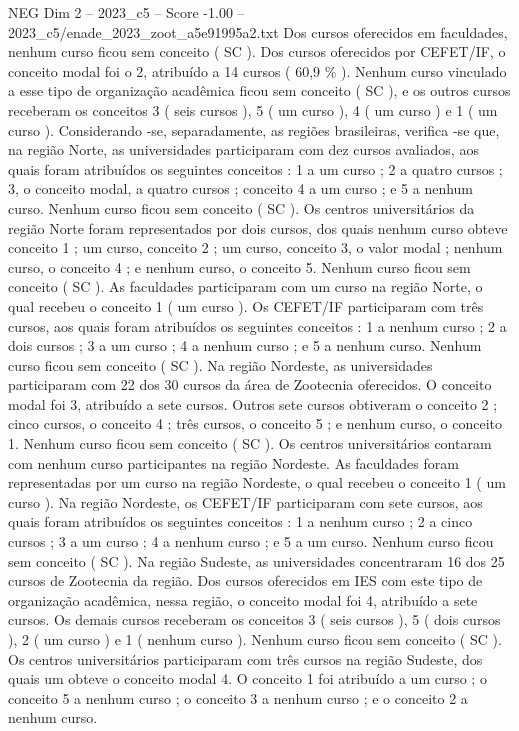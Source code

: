 \begin{textsample}{NEG Dim 2 – 2023\_c5 – Score -1.00 – 2023\_c5/enade\_2023\_zoot\_a5e91995a2.txt}
Dos cursos oferecidos em faculdades, nenhum curso ficou sem conceito ( SC ).
Dos cursos oferecidos por CEFET/IF, o conceito modal foi o 2, atribuído a 14 cursos ( 60,9 \% ).
Nenhum curso vinculado a esse tipo de organização acadêmica ficou sem conceito ( SC ), e os outros cursos receberam os conceitos 3 ( seis cursos ), 5 ( um curso ), 4 ( um curso ) e 1 ( um curso ).
Considerando -se, separadamente, as regiões brasileiras, verifica -se que, na região Norte, as universidades participaram com dez cursos avaliados, aos quais foram atribuídos os seguintes conceitos : 1 a um curso ; 2 a quatro cursos ; 3, o conceito modal, a quatro cursos ; conceito 4 a um curso ; e 5 a nenhum curso.
Nenhum curso ficou sem conceito ( SC ).
Os centros universitários da região Norte foram representados por dois cursos, dos quais nenhum curso obteve conceito 1 ; um curso, conceito 2 ; um curso, conceito 3, o valor modal ; nenhum curso, o conceito 4 ; e nenhum curso, o conceito 5.
Nenhum curso ficou sem conceito ( SC ).
As faculdades participaram com um curso na região Norte, o qual recebeu o conceito 1 ( um curso ).
Os CEFET/IF participaram com três cursos, aos quais foram atribuídos os seguintes conceitos : 1 a nenhum curso ; 2 a dois cursos ; 3 a um curso ; 4 a nenhum curso ; e 5 a nenhum curso.
Nenhum curso ficou sem conceito ( SC ).
Na região Nordeste, as universidades participaram com 22 dos 30 cursos da área de Zootecnia oferecidos.
O conceito modal foi 3, atribuído a sete cursos.
Outros sete cursos obtiveram o conceito 2 ; cinco cursos, o conceito 4 ; três cursos, o conceito 5 ; e nenhum curso, o conceito 1.
Nenhum curso ficou sem conceito ( SC ).
Os centros universitários contaram com nenhum curso participantes na região Nordeste.
As faculdades foram representadas por um curso na região Nordeste, o qual recebeu o conceito 1 ( um curso ).
Na região Nordeste, os CEFET/IF participaram com sete cursos, aos quais foram atribuídos os seguintes conceitos : 1 a nenhum curso ; 2 a cinco cursos ; 3 a um curso ; 4 a nenhum curso ; e 5 a um curso.
Nenhum curso ficou sem conceito ( SC ).
Na região Sudeste, as universidades concentraram 16 dos 25 cursos de Zootecnia da região.
Dos cursos oferecidos em IES com este tipo de organização acadêmica, nessa região, o conceito modal foi 4, atribuído a sete cursos.
Os demais cursos receberam os conceitos 3 ( seis cursos ), 5 ( dois cursos ), 2 ( um curso ) e 1 ( nenhum curso ).
Nenhum curso ficou sem conceito ( SC ).
Os centros universitários participaram com três cursos na região Sudeste, dos quais um obteve o conceito modal 4.
O conceito 1 foi atribuído a um curso ; o conceito 5 a nenhum curso ; o conceito 3 a nenhum curso ; e o conceito 2 a nenhum curso.

\end{textsample}
